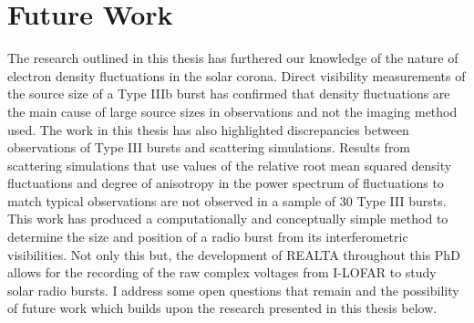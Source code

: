 \section{Future Work}
The research outlined in this thesis has furthered our knowledge of the nature of electron density fluctuations in the solar corona. Direct visibility measurements of the source size of a Type IIIb burst has confirmed that density fluctuations are the main cause of large source sizes in observations and not the imaging method used. The work in this thesis has also highlighted discrepancies between observations of Type III bursts and scattering simulations. Results from scattering simulations that use values of the relative root mean squared density fluctuations and degree of anisotropy in the power spectrum of fluctuations to match typical observations \citep[e.g.][]{Kontar2017} are not observed in a sample of 30 Type III bursts.
This work has produced a computationally and conceptually simple method to determine the size and position of a radio burst from its interferometric visibilities. Not only this but, the development of REALTA throughout this PhD allows for the recording of the raw complex voltages from I-LOFAR to study solar radio bursts. I address some open questions that remain and the possibility of future work which builds upon the research presented in this thesis below.
 
